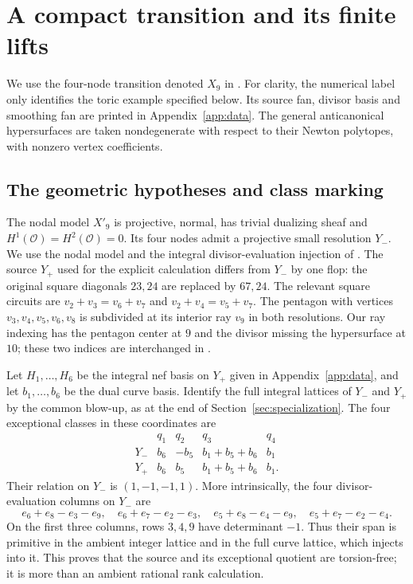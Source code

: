 \section{A compact transition and its finite lifts}\label{sec:geometry}

We use the four-node transition denoted $X_9$ in \cite{WuebbenMirror}.
For clarity, the numerical label only identifies the toric example
specified below. Its source fan, divisor basis and smoothing fan are
printed in Appendix~\ref{app:data}. The general anticanonical
hypersurfaces are taken nondegenerate with respect to their Newton
polytopes, with nonzero vertex coefficients.

\subsection{The geometric hypotheses and class marking}
The nodal model $X'_9$ is projective, normal, has trivial dualizing
sheaf and $H^1(\mathcal O)=H^2(\mathcal O)=0$. Its four nodes admit
a projective small resolution $Y_-$. We use the nodal model and the
integral divisor-evaluation injection of
\cite[Proposition 3.5, Lemma 9.7 and Section 11.1]{WuebbenMirror}.
The source $Y_+$ used for the explicit calculation differs from
$Y_-$ by one flop: the original square diagonals $23,24$ are replaced
by $67,24$. The relevant square circuits are
$v_2+v_3=v_6+v_7$ and $v_2+v_4=v_5+v_7$.
The pentagon with vertices $v_3,v_4,v_5,v_6,v_8$ is subdivided
at its interior ray $v_9$ in both resolutions. Our ray indexing
has the pentagon center at $9$ and the divisor missing the
hypersurface at $10$; these two indices are interchanged in
\cite{WuebbenMirror}.

Let $H_1,\ldots,H_6$ be the integral nef basis on $Y_+$ given in
Appendix~\ref{app:data}, and let $b_1,\ldots,b_6$ be the dual curve
basis. Identify the full integral lattices of $Y_-$ and $Y_+$ by the
common blow-up, as at the end of Section~\ref{sec:specialization}.
The four exceptional classes in these coordinates are
\[
\begin{array}{c|rrrr}
 &q_1&q_2&q_3&q_4\\ \hline
Y_-&b_6&-b_5&b_1+b_5+b_6&b_1\\
Y_+&b_6& b_5&b_1+b_5+b_6&b_1.
\end{array}
\]
Their relation on $Y_-$ is $(1,-1,-1,1)$. More intrinsically, the
four divisor-evaluation columns on $Y_-$ are
\[
 e_6+e_8-e_3-e_9,\quad e_6+e_7-e_2-e_3,\quad
 e_5+e_8-e_4-e_9,\quad e_5+e_7-e_2-e_4.
\]
On the first three columns, rows $3,4,9$ have determinant $-1$.
Thus their span is primitive in the ambient integer lattice and in
the full curve lattice, which injects into it. This proves that the
source and its exceptional quotient are torsion-free; it is more
than an ambient rational rank calculation.

